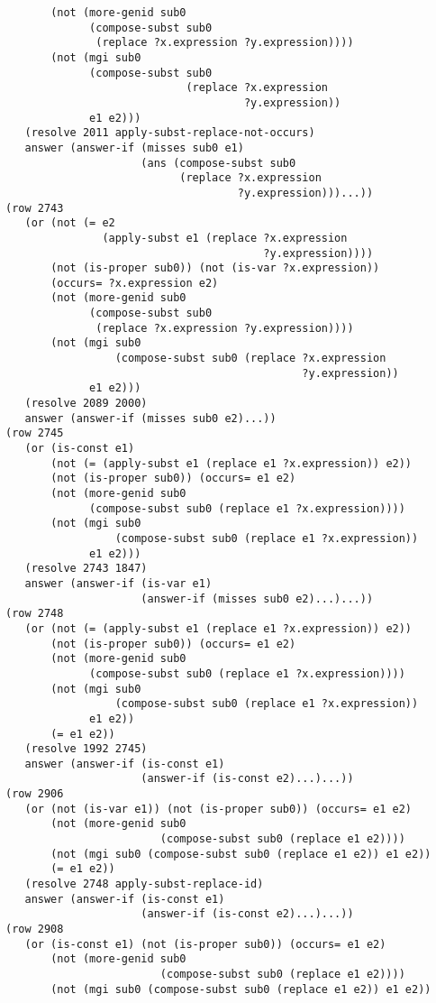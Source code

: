 \documentclass[runningheads]{llncs}
\begin{document}
\begin{verbatim}
       (not (more-genid sub0
             (compose-subst sub0
              (replace ?x.expression ?y.expression))))
       (not (mgi sub0
             (compose-subst sub0 
                            (replace ?x.expression 
                                     ?y.expression))
             e1 e2)))
   (resolve 2011 apply-subst-replace-not-occurs)
   answer (answer-if (misses sub0 e1)
                     (ans (compose-subst sub0
                           (replace ?x.expression 
                                    ?y.expression)))...))
(row 2743
   (or (not (= e2
               (apply-subst e1 (replace ?x.expression 
                                        ?y.expression))))
       (not (is-proper sub0)) (not (is-var ?x.expression))
       (occurs= ?x.expression e2)
       (not (more-genid sub0
             (compose-subst sub0
              (replace ?x.expression ?y.expression))))
       (not (mgi sub0
                 (compose-subst sub0 (replace ?x.expression 
                                              ?y.expression))
             e1 e2)))
   (resolve 2089 2000)
   answer (answer-if (misses sub0 e2)...))
(row 2745
   (or (is-const e1)
       (not (= (apply-subst e1 (replace e1 ?x.expression)) e2))
       (not (is-proper sub0)) (occurs= e1 e2)
       (not (more-genid sub0
             (compose-subst sub0 (replace e1 ?x.expression))))
       (not (mgi sub0 
                 (compose-subst sub0 (replace e1 ?x.expression))
             e1 e2)))
   (resolve 2743 1847)
   answer (answer-if (is-var e1)
                     (answer-if (misses sub0 e2)...)...))
(row 2748
   (or (not (= (apply-subst e1 (replace e1 ?x.expression)) e2))
       (not (is-proper sub0)) (occurs= e1 e2)
       (not (more-genid sub0
             (compose-subst sub0 (replace e1 ?x.expression))))
       (not (mgi sub0 
                 (compose-subst sub0 (replace e1 ?x.expression))
             e1 e2))
       (= e1 e2))
   (resolve 1992 2745)
   answer (answer-if (is-const e1)
                     (answer-if (is-const e2)...)...))
(row 2906
   (or (not (is-var e1)) (not (is-proper sub0)) (occurs= e1 e2)
       (not (more-genid sub0 
                        (compose-subst sub0 (replace e1 e2))))
       (not (mgi sub0 (compose-subst sub0 (replace e1 e2)) e1 e2))
       (= e1 e2))
   (resolve 2748 apply-subst-replace-id)
   answer (answer-if (is-const e1)
                     (answer-if (is-const e2)...)...))
(row 2908
   (or (is-const e1) (not (is-proper sub0)) (occurs= e1 e2)
       (not (more-genid sub0 
                        (compose-subst sub0 (replace e1 e2))))
       (not (mgi sub0 (compose-subst sub0 (replace e1 e2)) e1 e2))

\end{verbatim}
\end{document}
